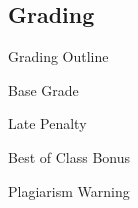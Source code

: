 \subsection{Grading}
\begin{frame}{Grading Outline}
\end{frame}

\begin{frame}{Base Grade}
\end{frame}

\begin{frame}{Late Penalty}
\end{frame}

\begin{frame}{Best of Class Bonus}
\end{frame}

\begin{frame}{Plagiarism Warning}
\end{frame}

%
%
%
%
%
%
%


